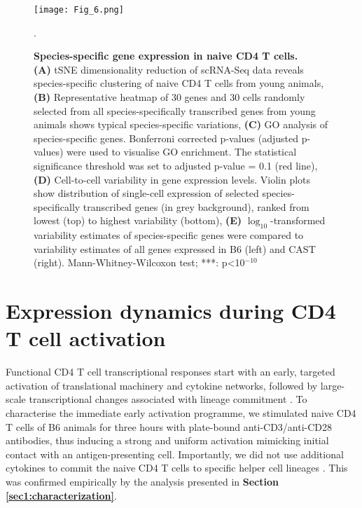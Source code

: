 \begin{figure}[!h]
\centering
\texttt{[image: Fig\_6.png]}
\caption[Species-specific gene expression in naive CD4\plus{} T cells]{\textbf{Species-specific gene expression in naive CD4\plus{} T cells.}\\
\textbf{(A)} tSNE dimensionality reduction of scRNA-Seq data reveals species-specific clustering of naive CD4\plus{} T cells from young animals, 
\textbf{(B)} Representative heatmap of 30 genes and 30 cells randomly selected from all species-specifically transcribed genes from young animals shows typical species-specific variations, 
\textbf{(C)} GO analysis of species-specific genes. Bonferroni corrected p-values (adjusted p-values) were used to visualise GO enrichment. The statistical significance threshold was set to adjusted p-value = 0.1 (red line), 
\textbf{(D)} Cell-to-cell variability in gene expression levels. Violin plots show distribution of single-cell expression of selected species-specifically transcribed genes (in grey background), ranked from lowest (top) to highest variability (bottom), 
\textbf{(E)} $\log_{10}$-transformed variability estimates of species-specific genes were compared to variability estimates of all genes expressed in B6 (left) and CAST (right). Mann-Whitney-Wilcoxon test; ***: p<10$^{-10}$}.
\label{fig1:species_specific}
\end{figure}

\newpage

\section{Expression dynamics during CD4\plus{} T cell activation}
\label{sec1:activation}

Functional CD4\plus{} T cell transcriptional responses start with an early, targeted activation of translational machinery and cytokine networks, followed by large-scale transcriptional changes associated with lineage commitment \citep{Shay2013, Asmal2003}. 
To characterise the immediate early activation programme, we stimulated naive CD4\plus{} T cells of B6 animals for three hours with plate-bound anti-CD3\textepsilon{}/anti-CD28 antibodies, thus inducing a strong and uniform activation mimicking initial contact with an antigen-presenting cell. 
Importantly, we did not use additional cytokines to commit the naive CD4\plus{} T cells to specific helper cell lineages \citep{Zhu2010}. 
This was confirmed empirically by the analysis presented in \textbf{Section \ref{sec1:characterization}}. 

